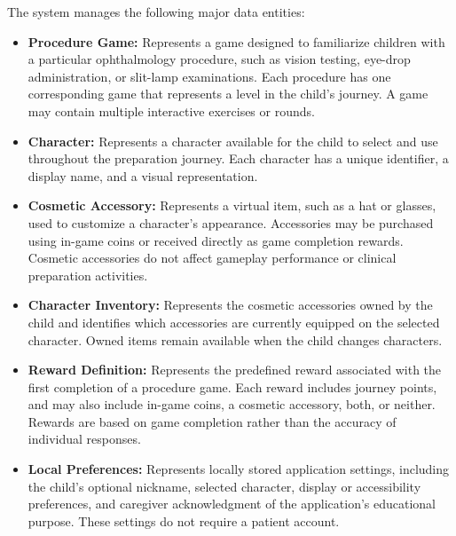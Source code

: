 \documentclass[10pt]{article}
\makeatletter
\newcommand{\termsecnum}{\ifnum\value{subsection}=0 \thesection\else\thesubsection\fi}
\newcommand{\termmark}[1]{%
  \hypertarget{term:#1}{}%
  \protected@write\@auxout{}{\string\newlabel{termsec:#1}{{\termsecnum}{\thepage}{}{}{}}}%
}
\makeatother
\begin{document}
The system manages the following major data entities:

\begin{itemize}

    \item \textbf{Procedure Game:}
    Represents a game designed to familiarize children
    with a particular ophthalmology procedure, such as
    vision testing, eye-drop administration, or slit-lamp
    examinations. Each procedure has one corresponding
    game that represents a level in the child's journey.
    A game may contain multiple interactive exercises
    or rounds.

    \item \textbf{Character:}
    Represents a character available for the child to
    select and use throughout the preparation journey.
    Each character has a unique identifier, a display
    name, and a visual representation.

    \item \textbf{Cosmetic Accessory:}
    Represents a virtual item, such as a hat or glasses,
    used to customize a character's appearance.
    Accessories may be purchased using in-game coins
    or received directly as game completion rewards.
    Cosmetic accessories do not affect gameplay
    performance or clinical preparation activities.

    \item \textbf{\termmark{characterinventory}Character Inventory:}
    Represents the cosmetic accessories owned by the
    child and identifies which accessories are currently
    equipped on the selected character. Owned items
    remain available when the child changes characters.

    \item \textbf{Reward Definition:}
    Represents the predefined reward associated with
    the first completion of a procedure game.
    Each reward includes journey points, and may also
    include in-game coins, a cosmetic accessory, both,
    or neither.
    Rewards are based on game completion rather
    than the accuracy of individual responses.

    \item \textbf{Local Preferences:}
    Represents locally stored application settings,
    including the child's optional nickname, selected
    character, display or accessibility preferences,
    and caregiver acknowledgment of
    the application's educational purpose.
    These settings do not require a patient account.


\end{itemize}
\end{document}
